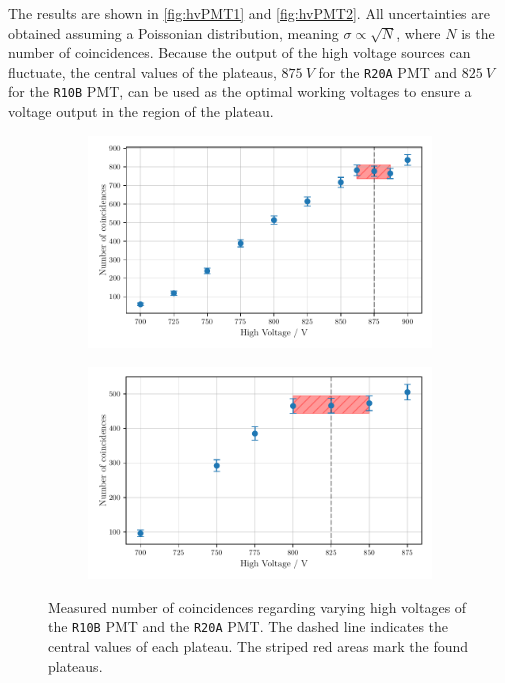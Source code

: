 The results are shown in \autoref{fig:hvPMT1} and \autoref{fig:hvPMT2}. All uncertainties are obtained 
assuming a Poissonian distribution, meaning $\sigma \propto \sqrt{N}$, where $N$ is the number of
coincidences. Because the output of the high voltage sources can fluctuate, the central values of the plateaus, $\SI{875}{V}$ for the \texttt{R20A} PMT and 
$\SI{825}{V}$ for the \texttt{R10B} PMT, can be used as the optimal working voltages to ensure
a voltage output in the region of the plateau.

\begin{figure}
        \centering
        \begin{subfigure}[b]{0.48\textwidth}
        \includegraphics[width=\textwidth]{plots/hvR20A.pdf}
        \label{fig:hvPMT1}
    \end{subfigure}\hfill
\begin{subfigure}[b]{0.48\textwidth}
        \includegraphics[width=\textwidth]{plots/hvR10B.pdf}
        \label{fig:hvPMT2}
\end{subfigure}
\caption{Measured number of coincidences regarding varying high voltages
of the \texttt{R10B} PMT and the \texttt{R20A} PMT.
The dashed line indicates the central values of each plateau. The striped red areas mark the found plateaus.}
\label{fig:hv}
\end{figure}
